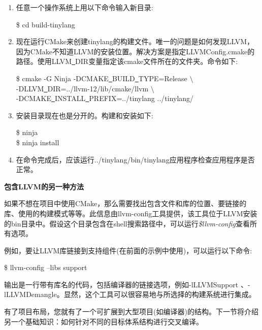 \begin{enumerate}
\item 任意一个操作系统上用以下命令输入新目录:
\begin{tcolorbox}[colback=white,colframe=black]
\$ cd build-tinylang
\end{tcolorbox}
	
\item 现在运行CMake来创建tinylang的构建文件。唯一的问题是如何发现LLVM，因为CMake不知道LLVM的安装位置。解决方案是指定LLVMConfig.cmake的路径。使用LLVM\underline{~}DIR变量指定该cmake文件所在的文件夹。命令如下:
\begin{tcolorbox}[colback=white,colframe=black]
\$ cmake -G Ninja -DCMAKE\underline{~}BUILD\underline{~}TYPE=Release $\setminus$ \\
\hspace*{1cm}-DLLVM\underline{~}DIR=../llvm-12/lib/cmake/llvm $\setminus$ \\
\hspace*{1cm}-DCMAKE\underline{~}INSTALL\underline{~}PREFIX=../tinylang ../tinylang/
\end{tcolorbox}

\item 安装目录现在也是分开的。构建和安装如下:
\begin{tcolorbox}[colback=white,colframe=black]
\$ ninja \\
\$ ninja install
\end{tcolorbox}

\item 在命令完成后，应该运行../tinylang/bin/tinylang应用程序检查应用程序是否正常。
\end{enumerate}


\hspace*{\fill} \par %
\textbf{包含LLVM的另一种方法}

如果不想在项目中使用CMake，那么需要找出包含文件和库的位置、要链接的库、使用的构建模式等等。此信息由llvm-config工具提供，该工具位于LLVM安装的bin目录中。假设这个目录包含在shell搜索路径中，可以运行\textit{\$llvm-config}查看所有选项。\par

例如，要让LLVM库链接到支持组件(在前面的示例中使用)，可以运行以下命令:\par

\begin{tcolorbox}[colback=white,colframe=black]
\$ llvm-config –libs support
\end{tcolorbox}

输出是一行带有库名的代码，包括编译器的链接选项，例如-lLLVMSupport 、-lLLVMDemangle。显然，这个工具可以很容易地与所选择的构建系统进行集成。\par

有了项目布局，您就有了一个可扩展到大型项目(如编译器)的结构。下一节将介绍另一个基础知识：如何针对不同的目标体系结构进行交叉编译。\par












